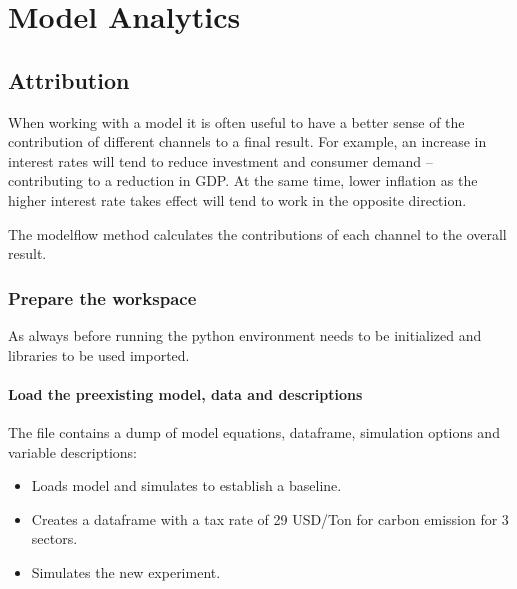 \documentclass[letterpaper,10pt,english]{jupyterBook}
\begin{document}
\part{Model Analytics}

\sphinxstepscope


\chapter{Attribution}
\label{\detokenize{content/06_ModelAnalytics/Attribution:attribution}}\label{\detokenize{content/06_ModelAnalytics/Attribution::doc}}
\sphinxAtStartPar
When working with a model it is often useful to have a better sense of the contribution of different channels to a final result.  For example, an increase in interest rates will tend to reduce investment and consumer demand – contributing to a reduction in GDP. At the same time, lower inflation as the higher interest rate takes effect will tend to work in the opposite direction.

\sphinxAtStartPar
The modelflow method  calculates the contributions of each channel to the overall result.


\section{Prepare the workspace}
\label{\detokenize{content/06_ModelAnalytics/Attribution:prepare-the-workspace}}
\sphinxAtStartPar
As always before running  the python environment needs to be initialized and libraries to be used imported.


\subsection{Load the pre\sphinxhyphen{}existing model, data and descriptions}
\label{\detokenize{content/06_ModelAnalytics/Attribution:load-the-pre-existing-model-data-and-descriptions}}
\sphinxAtStartPar
The file  contains a dump of model equations, dataframe, simulation options and variable descriptions:
\begin{itemize}
\item {} 
\sphinxAtStartPar
Loads model and simulates to establish a baseline.

\item {} 
\sphinxAtStartPar
Creates a dataframe with a tax rate of 29 USD/Ton for carbon emission for 3 sectors.

\item {} 
\sphinxAtStartPar
Simulates the new experiment.

\end{itemize}
\end{document}
